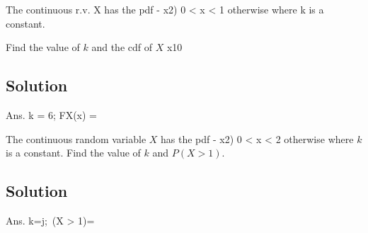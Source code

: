 \documentclass[a4paper12pt]{article}
\begin{document}
\large 




The continuous r.v. X has the pdf 
- x2) 0 < x < 1 
otherwise 
where k is a constant. 

Find the value of $k$ and the cdf of $X$ 
x10 
\subsection*{Solution}
Ans. k = 6; FX(x) = 

\newpage 

The continuous random variable $X$ has the pdf 
- x2) 0 < x < 2 
otherwise 
where $k$ is a constant. Find the value of $k$ and $P(X > 1)$. 

\subsection*{Solution}
Ans. k=j;~(X > 1)= 
\end{document}
